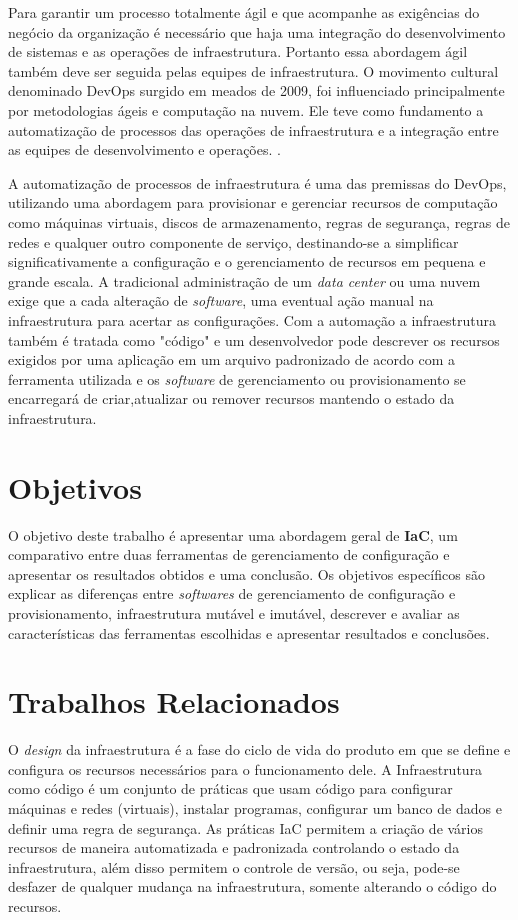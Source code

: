 Para garantir um processo totalmente ágil e que acompanhe as exigências do negócio da organização é necessário que haja uma integração do desenvolvimento de sistemas e as operações de infraestrutura. Portanto essa abordagem ágil também deve ser seguida pelas equipes de infraestrutura.
O movimento cultural denominado DevOps surgido em meados de 2009, foi influenciado principalmente por metodologias ágeis e computação na nuvem. Ele teve como fundamento a automatização de processos das operações de infraestrutura e a integração entre as equipes de desenvolvimento e operações. \cite{sato}.

A automatização de processos de infraestrutura é uma das premissas do DevOps, utilizando uma abordagem para provisionar e gerenciar recursos de computação como máquinas virtuais, discos de armazenamento, regras de segurança, regras de redes e qualquer outro componente de serviço, destinando-se a simplificar significativamente a configuração e o gerenciamento de recursos em pequena e grande escala. A tradicional administração de um \textit{data center} ou uma nuvem exige que a cada alteração de \textit{software}, uma eventual ação manual na infraestrutura para acertar as configurações. Com a automação a infraestrutura também é tratada como "código" e um desenvolvedor pode descrever os recursos exigidos por uma aplicação em um arquivo padronizado de acordo com a ferramenta utilizada e os \textit{software} de gerenciamento ou provisionamento se encarregará de criar,atualizar ou remover recursos mantendo o estado da infraestrutura. 

\section{\esp Objetivos}

O objetivo deste trabalho é apresentar uma abordagem geral de \textbf{IaC}, um comparativo entre duas ferramentas de gerenciamento de configuração e apresentar os resultados obtidos e uma conclusão. 
Os objetivos específicos são explicar as diferenças entre \textit{softwares} de gerenciamento de configuração e provisionamento, infraestrutura mutável e imutável, descrever e avaliar as características das ferramentas escolhidas e apresentar resultados e conclusões.  

\section{\esp Trabalhos Relacionados}

O \textit{design} da infraestrutura é a fase do ciclo de vida do produto em que se define e configura os recursos necessários para o funcionamento dele. A Infraestrutura como código é um conjunto de práticas que usam código para configurar máquinas e redes (virtuais), instalar programas, configurar um banco de dados e definir uma regra de segurança. As práticas IaC permitem a criação de vários recursos de maneira automatizada e padronizada controlando o estado da infraestrutura, além disso permitem o controle de versão, ou seja, pode-se desfazer de qualquer mudança na infraestrutura, somente alterando o código do recursos. \cite{Carnegie}

